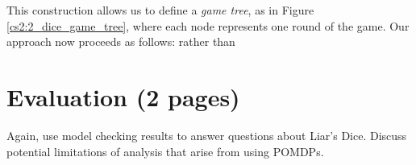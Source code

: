 This construction allows us to define a \emph{game tree}, as in Figure \ref{cs2:2_dice_game_tree}, where each node represents one round of the game. Our approach now proceeds as follows: rather than 


\section{Evaluation (2 pages)}

Again, use model checking results to answer questions about Liar's Dice. Discuss potential limitations of analysis that arise from using POMDPs.

